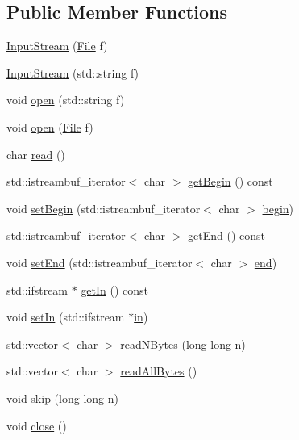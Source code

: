 \subsection*{Public Member Functions}
\begin{DoxyCompactItemize}
\item 
\mbox{\hyperlink{class_erable_1_1_i_o_1_1_input_stream_ad71880c93829a386f863013a97fad3e5}{Input\+Stream}} (\mbox{\hyperlink{class_erable_1_1_i_o_1_1_file}{File}} f)
\item 
\mbox{\hyperlink{class_erable_1_1_i_o_1_1_input_stream_a9f63847d7c6e31e4e0385c26ae613b0b}{Input\+Stream}} (std\+::string f)
\item 
void \mbox{\hyperlink{class_erable_1_1_i_o_1_1_input_stream_aa7bbe6c887f7dfca47ee7948830ac387}{open}} (std\+::string f)
\item 
void \mbox{\hyperlink{class_erable_1_1_i_o_1_1_input_stream_a58966ef7c7b67ad1190873efb336b488}{open}} (\mbox{\hyperlink{class_erable_1_1_i_o_1_1_file}{File}} f)
\item 
char \mbox{\hyperlink{class_erable_1_1_i_o_1_1_input_stream_a5ef767d077af695ca7cbedcb2baec937}{read}} ()
\item 
std\+::istreambuf\+\_\+iterator$<$ char $>$ \mbox{\hyperlink{class_erable_1_1_i_o_1_1_input_stream_ac70732e7176925ececbea26cbd622c67}{get\+Begin}} () const
\item 
void \mbox{\hyperlink{class_erable_1_1_i_o_1_1_input_stream_a97f2ccc044a4b05428514ac5e52244cd}{set\+Begin}} (std\+::istreambuf\+\_\+iterator$<$ char $>$ \mbox{\hyperlink{class_erable_1_1_i_o_1_1_input_stream_ae5ef880f2573b7d486c72007c85bb759}{begin}})
\item 
std\+::istreambuf\+\_\+iterator$<$ char $>$ \mbox{\hyperlink{class_erable_1_1_i_o_1_1_input_stream_a18616788cf983a613a8c4de8a09a12d9}{get\+End}} () const
\item 
void \mbox{\hyperlink{class_erable_1_1_i_o_1_1_input_stream_aa45e3093d984780d245d568972e99d76}{set\+End}} (std\+::istreambuf\+\_\+iterator$<$ char $>$ \mbox{\hyperlink{class_erable_1_1_i_o_1_1_input_stream_aa65bd60380fa5a413f8a7689ee86f2f9}{end}})
\item 
std\+::ifstream $\ast$ \mbox{\hyperlink{class_erable_1_1_i_o_1_1_input_stream_a993c824fee78161f5db23399ba6ba2ba}{get\+In}} () const
\item 
void \mbox{\hyperlink{class_erable_1_1_i_o_1_1_input_stream_abf014ba4c5a3882f7062b18c351b4503}{set\+In}} (std\+::ifstream $\ast$\mbox{\hyperlink{class_erable_1_1_i_o_1_1_input_stream_a6971259f7e4a52a38e6f999419c95588}{in}})
\item 
std\+::vector$<$ char $>$ \mbox{\hyperlink{class_erable_1_1_i_o_1_1_input_stream_a68a76035786ad05e140f786c4df108c5}{read\+N\+Bytes}} (long long n)
\item 
std\+::vector$<$ char $>$ \mbox{\hyperlink{class_erable_1_1_i_o_1_1_input_stream_a1a1c56922dc91bed0229dfdff3672bca}{read\+All\+Bytes}} ()
\item 
void \mbox{\hyperlink{class_erable_1_1_i_o_1_1_input_stream_aa18c233597ea50de7d79d5e6125eb83a}{skip}} (long long n)
\item 
void \mbox{\hyperlink{class_erable_1_1_i_o_1_1_input_stream_a8d84cee499f226bdd56a2e3b4333d78d}{close}} ()
\end{DoxyCompactItemize}
